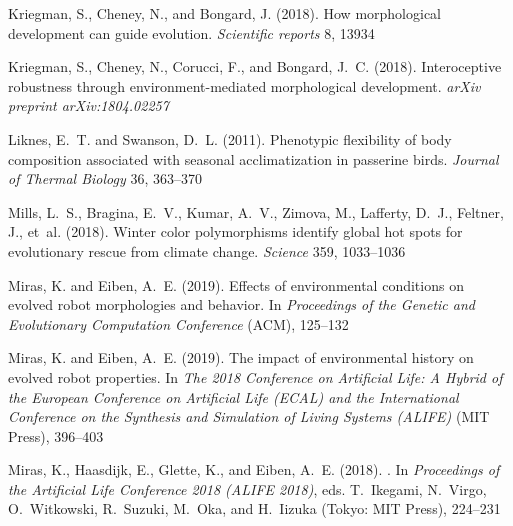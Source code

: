 \documentclass[utf8]{frontiersSCNS} %
\begin{document}
\begin{thebibliography}{29}
Kriegman, S., Cheney, N., and Bongard, J. (2018{}).
\newblock How morphological development can guide evolution.
\newblock \emph{Scientific reports} 8, 13934

Kriegman, S., Cheney, N., Corucci, F., and Bongard, J.~C. (2018{}).
\newblock Interoceptive robustness through environment-mediated morphological
  development.
\newblock \emph{arXiv preprint arXiv:1804.02257}

Liknes, E.~T. and Swanson, D.~L. (2011).
\newblock Phenotypic flexibility of body composition associated with seasonal
  acclimatization in passerine birds.
\newblock \emph{Journal of Thermal Biology} 36, 363--370

Mills, L.~S., Bragina, E.~V., Kumar, A.~V., Zimova, M., Lafferty, D.~J.,
  Feltner, J., et~al. (2018).
\newblock Winter color polymorphisms identify global hot spots for evolutionary
  rescue from climate change.
\newblock \emph{Science} 359, 1033--1036

Miras, K. and Eiben, A.~E. (2019{}).
\newblock Effects of environmental conditions on evolved robot morphologies and
  behavior.
\newblock In \emph{Proceedings of the Genetic and Evolutionary Computation
  Conference} (ACM), 125--132

Miras, K. and Eiben, A.~E. (2019{}).
\newblock The impact of environmental history on evolved robot properties.
\newblock In \emph{The 2018 Conference on Artificial Life: A Hybrid of the
  European Conference on Artificial Life (ECAL) and the International
  Conference on the Synthesis and Simulation of Living Systems (ALIFE)} (MIT
  Press), 396--403

Miras, K., Haasdijk, E., Glette, K., and Eiben, A.~E. (2018{}).
.
\newblock In \emph{Proceedings of the Artificial Life Conference 2018 (ALIFE
  2018)}, eds. T.~Ikegami, N.~Virgo, O.~Witkowski, R.~Suzuki, M.~Oka, and
  H.~Iizuka (Tokyo: MIT Press), 224--231


\end{thebibliography}
\end{document}
